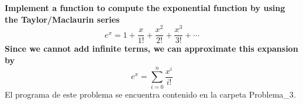 \item \textbf{Implement a function to compute the exponential function by using the
    Taylor/Maclaurin series
    \begin{equation*}
        e^x= 1+ \frac{x}{1!}+\frac{x^2}{2!}+\frac{x^3}{3!}+ \cdots
    \end{equation*}
    Since we cannot add infinite terms, we can approximate this expansion by
    \begin{equation*}
        e^x= \sum_{i=0}^n \frac{x^i}{i!}
    \end{equation*}
}
El programa de este problema se encuentra contenido en la carpeta \textcolor{citecolor}{Problema\_3}.